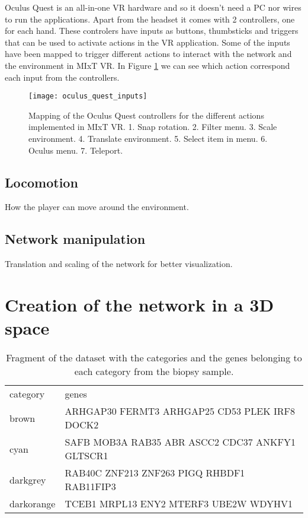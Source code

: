 Oculus Quest is an all-in-one VR hardware and so it doesn't need a PC nor wires to run the applications. Apart from the headset it comes with 2 controllers, one for each hand. These controlers have inputs as buttons, thumbsticks and triggers that can be used to activate actions in the VR application. Some of the inputs have been mapped to trigger different actions to interact with the network and the environment in MIxT VR. In Figure \ref{fig:oculus_quest_inputs} we can see which action correspond each input from the controllers.

\begin{figure}[h!]
    \centering%
    \texttt{[image: oculus\_quest\_inputs]}
    \caption{Mapping of the Oculus Quest controllers for the different actions implemented in MIxT VR. 1. Snap rotation. 2. Filter menu. 3. Scale environment. 4. Translate environment. 5. Select item in menu. 6. Oculus menu. 7. Teleport.}
    \label{fig:oculus_quest_inputs}
\end{figure}%

\subsection{Locomotion}
How the player can move around the environment.

\subsection{Network manipulation}
Translation and scaling of the network for better visualization.

\section{Creation of the network in a 3D space}

\begin{table}[h!]
\centering
\begin{tabular}{ll}
\hline
category & genes          \\
brown   & ARHGAP30 FERMT3 ARHGAP25 CD53 PLEK IRF8 DOCK2\\
cyan  & SAFB MOB3A RAB35 ABR ASCC2 CDC37 ANKFY1 GLTSCR1\\
darkgrey  & RAB40C ZNF213 ZNF263 PIGQ RHBDF1 RAB11FIP3\\
darkorange  & TCEB1 MRPL13 ENY2 MTERF3 UBE2W WDYHV1\\
\hline
\end{tabular}
\caption{Fragment of the dataset with the categories and the genes belonging to each category from the biopsy sample.}
\label{tab:categories-data}
\end{table}

